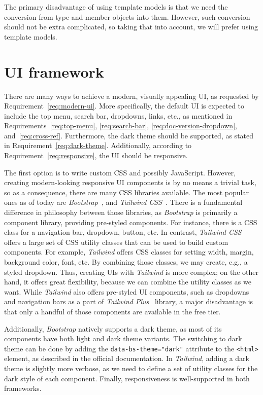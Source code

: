 The primary disadvantage of using template models is that we need the conversion from type and member objects into them. 
However, such conversion should not be extra complicated, so taking that into account, we will prefer using template models.

\section{UI framework}
\label{sec:tech-analysis-ui-framework}

There are many ways to achieve a modern, visually appealing UI, as requested by Requirement~\ref{req:modern-ui}.
More specifically, the default UI is expected to include the top menu, search bar, dropdowns, links, etc., as mentioned in Requirements~\ref{req:top-menu}, \ref{req:search-bar}, \ref{req:doc-version-dropdown}, and~\ref{req:cross-ref}.
Furthermore, the dark theme should be supported, as stated in Requirement~\ref{req:dark-theme}.
Additionally, according to Requirement~\ref{req:responsive}, the UI should be responsive.

The first option is to write custom CSS and possibly JavaScript. 
However, creating modern-looking responsive UI components is by no means a trivial task, so as a consequence, there are many CSS libraries available.
The most popular ones as of today are \textit{Bootstrap}~\cite{boostrap}, and
\textit{Tailwind CSS}~\cite{tailwind}. 
There is a fundamental difference in philosophy between those libraries, as \textit{Bootstrap} is primarily a component library, providing pre-styled components.
For instance, there is a CSS class for a navigation bar, dropdown, button, etc.
In contrast, \textit{Tailwind CSS} offers a large set of CSS utility classes that can be used to build custom components.
For example, \textit{Tailwind} offers CSS classes for setting width, margin, background color, font, etc.
By combining those classes, we may create, e.g., a styled dropdown.
Thus, creating UIs with \textit{Tailwind} is more complex; on the other hand, it offers great flexibility, because we can combine the utility classes as we want.
While \textit{Tailwind} also offers pre-styled UI components, such as dropdowns and navigation bars as a part of \textit{Tailwind Plus}~\cite{tailwind_plus} library, a major disadvantage is that only a handful of those components are available in the free tier.

Additionally, \textit{Bootstrap} natively supports a dark theme, as most of its components have both light and dark theme variants. 
The switching to dark theme can be done by adding the \texttt{data-bs-theme="dark"} attribute to the \texttt{<html>} element, as described in the official documentation.
In \textit{Tailwind}, adding a dark theme is slightly more verbose, as we need to define a set of utility classes for the dark style of each component.
Finally, responsiveness is well-supported in both frameworks.

